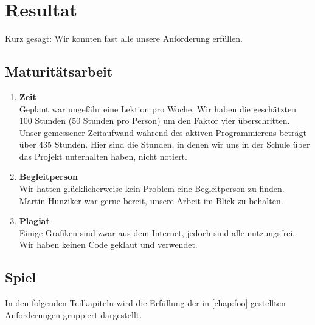 

\renewcommand{\figurename}{Abb.}

\chapter{Resultat}
Kurz gesagt: Wir konnten fast alle unsere Anforderung erfüllen.

\section{Maturitätsarbeit}
\begin{enumerate}
    \item \textbf{Zeit} \\
        Geplant war ungefähr eine Lektion pro Woche. Wir haben die geschätzten 100 Stunden (50 Stunden pro Person) um den Faktor vier überschritten. Unser gemessener Zeitaufwand während des aktiven Programmierens
        beträgt über 435 Stunden. Hier sind die Stunden, in denen wir uns in der Schule über das Projekt unterhalten haben, nicht notiert.
    \item \textbf{Begleitperson} \\
        Wir hatten glücklicherweise kein Problem eine Begleitperson zu finden. Martin Hunziker war gerne bereit, unsere Arbeit im Blick zu behalten.
    \item \textbf{Plagiat} \\
        Einige Grafiken sind zwar aus dem Internet, jedoch sind alle nutzungsfrei. Wir haben keinen Code geklaut und verwendet. 
\end{enumerate}

\section{Spiel}
In den folgenden Teilkapiteln wird die Erfüllung der in \autoref{chap:foo} gestellten Anforderungen gruppiert dargestellt. 

